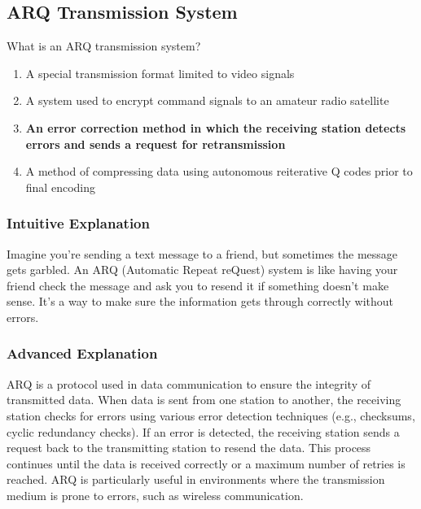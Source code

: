 \subsection{ARQ Transmission System}
\label{T8D11}

\begin{tcolorbox}[colback=gray!10!white,colframe=black!75!black,title=T8D11]
What is an ARQ transmission system?
\begin{enumerate}[noitemsep]
    \item A special transmission format limited to video signals
    \item A system used to encrypt command signals to an amateur radio satellite
    \item \textbf{An error correction method in which the receiving station detects errors and sends a request for retransmission}
    \item A method of compressing data using autonomous reiterative Q codes prior to final encoding
\end{enumerate}
\end{tcolorbox}

\subsubsection*{Intuitive Explanation}
Imagine you're sending a text message to a friend, but sometimes the message gets garbled. An ARQ (Automatic Repeat reQuest) system is like having your friend check the message and ask you to resend it if something doesn't make sense. It's a way to make sure the information gets through correctly without errors.

\subsubsection*{Advanced Explanation}
ARQ is a protocol used in data communication to ensure the integrity of transmitted data. When data is sent from one station to another, the receiving station checks for errors using various error detection techniques (e.g., checksums, cyclic redundancy checks). If an error is detected, the receiving station sends a request back to the transmitting station to resend the data. This process continues until the data is received correctly or a maximum number of retries is reached. ARQ is particularly useful in environments where the transmission medium is prone to errors, such as wireless communication.
